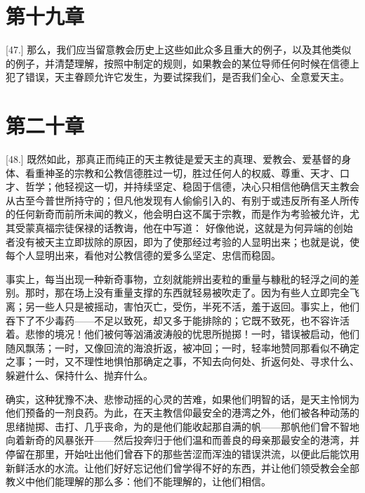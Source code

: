 
\section{第十九章}

\par

[47.] 那么，我们应当留意教会历史上这些如此众多且重大的例子，以及其他类似的例子，并清楚理解，按照中制定的规则，如果教会的某位导师任何时候在信德上犯了错误，天主眷顾允许它发生，为要试探我们，是否我们全心、全意爱天主。\par


\section{第二十章}

\par

[48.] 既然如此，那真正而纯正的天主教徒是爱天主的真理、爱教会、爱基督的身体、看重神圣的宗教和公教信德胜过一切，胜过任何人的权威、尊重、天才、口才、哲学；他轻视这一切，并持续坚定、稳固于信德，决心只相信他确信天主教会从古至今普世所持守的；但凡他发现有人偷偷引入的、有别于或违反所有圣人所传的任何新奇而前所未闻的教义，他会明白这不属于宗教，而是作为考验被允许，尤其受蒙真福宗徒保禄的话教诲，他在中写道： 好像他说，这就是为何异端的创始者没有被天主立即拔除的原因，即为了使那经过考验的人显明出来；也就是说，使每个人显明出来，看他对公教信德的爱多么坚定、忠信而稳固。\par

事实上，每当出现一种新奇事物，立刻就能辨出麦粒的重量与糠秕的轻浮之间的差别。那时，那在场上没有重量支撑的东西就轻易被吹走了。因为有些人立即完全飞离；另一些人只是被摇动，害怕灭亡，受伤，半死不活，羞于返回。事实上，他们吞下了不少毒药——不足以致死，却又多于能排除的；它既不致死，也不容许活着。悲惨的境况！他们被何等汹涌波涛般的忧思所抛掷！一时，错误被启动，他们随风飘荡；一时，又像回流的海浪折返，被冲回；一时，轻率地赞同那看似不确定之事；一时，又不理性地惧怕那确定之事，不知去向何处、折返何处、寻求什么、躲避什么、保持什么、抛弃什么。\par

确实，这种犹豫不决、悲惨动摇的心灵的苦难，如果他们明智的话，是天主怜悯为他们预备的一剂良药。为此，在天主教信仰最安全的港湾之外，他们被各种动荡的思绪抛掷、击打、几乎丧命，为的是他们能收起那自满的帆——那帆他们曾不智地向着新奇的风暴张开——然后投奔归于他们温和而善良的母亲那最安全的港湾，并停留在那里，开始吐出他们曾吞下的那些苦涩而浑浊的错误洪流，以便此后能饮用新鲜活水的水流。让他们好好忘记他们曾学得不好的东西，并让他们领受教会全部教义中他们能理解的那么多：他们不能理解的，让他们相信。\par


